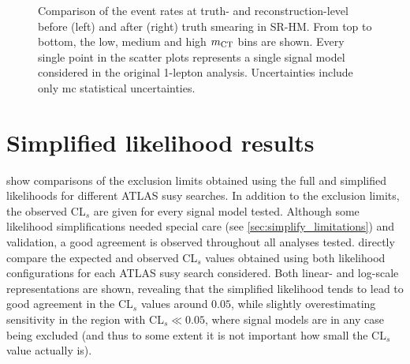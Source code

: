 \begin{figure}
\begin{subfigure}[b]{0.49\linewidth}
	\end{subfigure}
	\caption{Comparison of the event rates at truth- and reconstruction-level before (left) and after (right) truth smearing in SR-HM. From top to bottom, the low, medium and high $m_{\textrm{CT}}$ bins are shown. Every single point in the scatter plots represents a single signal model considered in the original 1-lepton analysis. Uncertainties include only \gls{mc} statistical uncertainties.}
	\label{fig:smearing_signal_regions_3}
\end{figure}


\FloatBarrier

\ifpdf
\graphicspath{{chapter-simplify/Figs/Raster/}{chapter-simplify/Figs/PDF/}{chapter-simplify/Figs/}}
\else
\graphicspath{{chapter-simplify/Figs/Vector/}{chapter-simplify/Figs/}}
\fi


\section{Simplified likelihood results}

 show comparisons of the exclusion limits obtained using the full and simplified likelihoods for different ATLAS \gls{susy} searches. In addition to the exclusion limits, the observed CL$_s$ are given for every signal model tested. Although some likelihood simplifications needed special care (see \cref{sec:simplify_limitations}) and validation, a good agreement is observed throughout all analyses tested.  directly compare the expected and observed CL$_s$ values obtained using both likelihood configurations for each ATLAS \gls{susy} search considered. Both linear- and log-scale representations are shown, revealing that the simplified likelihood tends to lead to good agreement in the CL$_s$ values around $0.05$, while slightly overestimating sensitivity in the region with CL$_s \ll 0.05$, where signal models are in any case being excluded (and thus to some extent it is not important how small the CL$_s$ value actually is).

\vspace{5em}

